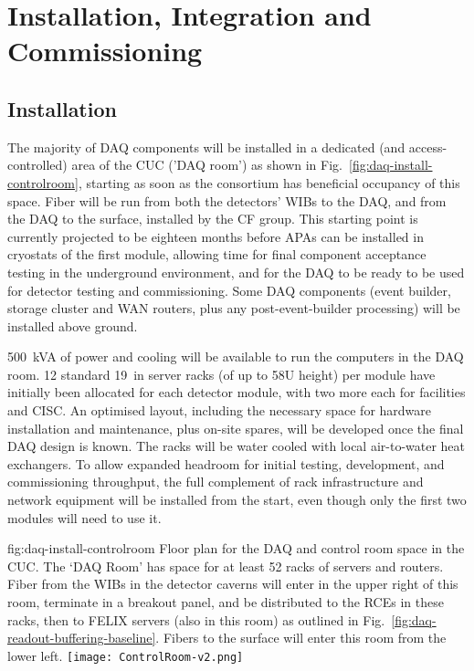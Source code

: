 
\section{Installation, Integration and Commissioning}
\label{sec:fdsp-daq-install}

\subsection{Installation}
\label{sec:fdsp-daq-install-transport}

The majority of DAQ components will be installed in a dedicated (and access-controlled) area of the CUC ('DAQ room') as shown in Fig.~\ref{fig:daq-install-controlroom}, starting as soon as the consortium has beneficial occupancy of this space. Fiber will be run from both the detectors' WIBs to the DAQ, and from the DAQ to the surface, installed by the CF group. This starting point is currently projected to be eighteen months before APAs can be installed in cryostats of the first module, allowing time for final component acceptance testing in the underground environment, and for the DAQ to be ready to be used for detector testing and commissioning. Some DAQ components (event builder, storage cluster and WAN routers, plus any post-event-builder processing) will be installed above ground.

\SI{500}{kVA} of power and cooling will be available to run the computers in the DAQ room. 12 standard \SI{19}{in} server racks (of up to 58U height) per module have initially been allocated for each detector module, with two more each for facilities and CISC. An optimised layout, including the necessary space for hardware installation and maintenance, plus on-site spares, will be developed once the final DAQ design is known. The racks will be water cooled with local air-to-water heat exchangers. To allow expanded headroom for initial testing, development, and commissioning throughput, the full complement of rack infrastructure and network equipment will be installed from the start, even though only the first two modules will need to use it.

\begin{dunefigure}{fig:daq-install-controlroom}
  {Floor plan for the DAQ and control room space in the CUC.  The `DAQ
    Room' has space for at least 52 racks of servers and routers.
    Fiber from the WIBs in the detector caverns will enter in the upper
    right of this room, terminate in a breakout panel, and be
    distributed to the RCEs in these racks, then to FELIX servers (also
    in this room) as outlined in
    Fig.~\ref{fig:daq-readout-buffering-baseline}.  Fibers to the
    surface will enter this room from the lower left.}
\texttt{[image: ControlRoom-v2.png]}
\end{dunefigure}

